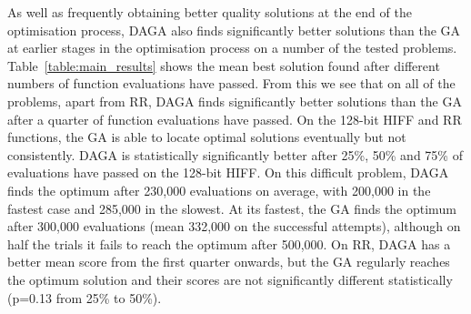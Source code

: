 \documentclass[runningheads,a4paper]{llncs}
\begin{document}
As well as frequently obtaining better quality solutions at the end of the optimisation process, DAGA also finds significantly better solutions than the GA at earlier stages in the optimisation process on a number of the tested problems. Table~\ref{table:main_results} shows the mean best solution found after different numbers of function evaluations have passed. From this we see that on all of the problems, apart from RR, DAGA finds significantly better solutions than the GA after a quarter of function evaluations have passed. On the 128-bit HIFF and RR functions, the GA is able to locate optimal solutions eventually but not consistently. DAGA is statistically significantly better after 25\%, 50\% and 75\% of evaluations have passed on the 128-bit HIFF. On this difficult problem, DAGA finds the optimum after 230,000 evaluations on average, with 200,000 in the fastest case and 285,000 in the slowest. At its fastest, the GA finds the optimum after 300,000 evaluations (mean 332,000 on the successful attempts), although on half the trials it fails to reach the optimum after 500,000. On RR, DAGA has a better mean score from the first quarter onwards, but the GA regularly reaches the optimum solution and their scores are not significantly different statistically (p=0.13 from 25\% to 50\%).
\end{document}
